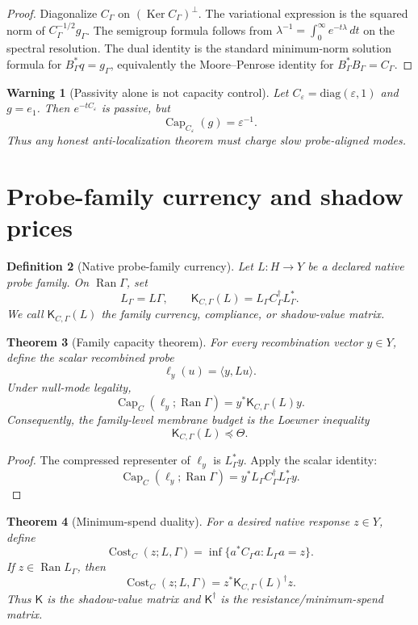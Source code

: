 \documentclass[11pt]{article}
\newtheorem{theorem}{Theorem}[section]
\newtheorem{definition}[theorem]{Definition}
\newtheorem{warning}[theorem]{Warning}
\DeclareMathOperator{\range}{Ran}
\DeclareMathOperator{\kernel}{Ker}
\DeclareMathOperator{\Capacity}{Cap}
\DeclareMathOperator{\Cost}{Cost}
\newcommand{\K}{\mathsf K}
\newcommand{\eps}{\varepsilon}
\begin{document}
\begin{proof}
Diagonalize \(C_\Gamma\) on \((\kernel C_\Gamma)^\perp\).  The variational expression is the squared norm of \(C_\Gamma^{-1/2}g_\Gamma\).  The semigroup formula follows from \(\lambda^{-1}=\int_0^\infty e^{-t\lambda}\,dt\) on the spectral resolution.  The dual identity is the standard minimum-norm solution formula for \(B_\Gamma^*q=g_\Gamma\), equivalently the Moore--Penrose identity for \(B_\Gamma^*B_\Gamma=C_\Gamma\).
\end{proof}

\begin{warning}[Passivity alone is not capacity control]
Let \(C_\eps=\mathrm{diag}(\eps,1)\) and \(g=e_1\).  Then \(e^{-tC_\eps}\) is passive, but
\[
  \Capacity_{C_\eps}(g)=\eps^{-1}.
\]
Thus any honest anti-localization theorem must charge slow probe-aligned modes.
\end{warning}

\section{Probe-family currency and shadow prices}

\begin{definition}[Native probe-family currency]
Let \(L:H\to Y\) be a declared native probe family.  On \(\range\Gamma\), set
\[
  L_\Gamma=L\Gamma,
  \qquad
  \K_{C,\Gamma}(L)=L_\Gamma C_\Gamma^\dagger L_\Gamma^*.
\]
We call \(\K_{C,\Gamma}(L)\) the family currency, compliance, or shadow-value matrix.
\end{definition}

\begin{theorem}[Family capacity theorem]
For every recombination vector \(y\in Y\), define the scalar recombined probe
\[
  \ell_y(u)=\langle y,Lu\rangle.
\]
Under null-mode legality,
\[
  \Capacity_C(\ell_y;\range\Gamma)=y^*\K_{C,\Gamma}(L)y.
\]
Consequently, the family-level membrane budget is the Loewner inequality
\[
  \K_{C,\Gamma}(L)\preceq\Theta.
\]
\end{theorem}

\begin{proof}
The compressed representer of \(\ell_y\) is \(L_\Gamma^*y\).  Apply the scalar identity:
\[
  \Capacity_C(\ell_y;\range\Gamma)
  =y^*L_\Gamma C_\Gamma^\dagger L_\Gamma^*y.
\]
\end{proof}

\begin{theorem}[Minimum-spend duality]
For a desired native response \(z\in Y\), define
\[
  \Cost_C(z;L,\Gamma)=\inf\{a^*C_\Gamma a:L_\Gamma a=z\}.
\]
If \(z\in\range L_\Gamma\), then
\[
  \Cost_C(z;L,\Gamma)=z^*\K_{C,\Gamma}(L)^\dagger z.
\]
Thus \(\K\) is the shadow-value matrix and \(\K^\dagger\) is the resistance/minimum-spend matrix.
\end{theorem}
\end{document}
